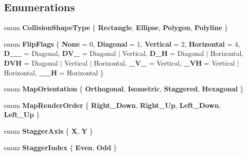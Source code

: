 \subsection*{Enumerations}
\begin{DoxyCompactItemize}
\item 
\mbox{\label{namespace_super_tiled2_unity_a1dc79a7d674bb0cfa8cba3ef988cd9f3}} 
enum {\bfseries Collision\+Shape\+Type} \{ {\bfseries Rectangle}, 
{\bfseries Ellipse}, 
{\bfseries Polygon}, 
{\bfseries Polyline}
 \}
\item 
\mbox{\label{namespace_super_tiled2_unity_a3e1240f05aacb2d37ab178382ef3f92b}} 
enum {\bfseries Flip\+Flags} \{ \newline
{\bfseries None} = 0, 
{\bfseries Diagonal} = 1, 
{\bfseries Vertical} = 2, 
{\bfseries Horizontal} = 4, 
\newline
{\bfseries D\+\_\+\+\_\+} = Diagonal, 
{\bfseries D\+V\+\_\+} = Diagonal $\vert$ Vertical, 
{\bfseries D\+\_\+H} = Diagonal $\vert$ Horizontal, 
{\bfseries D\+VH} = Diagonal $\vert$ Vertical $\vert$ Horizontal, 
\newline
{\bfseries \+\_\+\+V\+\_\+} = Vertical, 
{\bfseries \+\_\+\+VH} = Vertical $\vert$ Horizontal, 
{\bfseries \+\_\+\+\_\+H} = Horizontal
 \}
\item 
\mbox{\label{namespace_super_tiled2_unity_a5f92c37d9d310a28ddc8019606041566}} 
enum {\bfseries Map\+Orientation} \{ {\bfseries Orthogonal}, 
{\bfseries Isometric}, 
{\bfseries Staggered}, 
{\bfseries Hexagonal}
 \}
\item 
\mbox{\label{namespace_super_tiled2_unity_af5f6635752242fe31beeb61f287091a0}} 
enum {\bfseries Map\+Render\+Order} \{ {\bfseries Right\+\_\+\+Down}, 
{\bfseries Right\+\_\+\+Up}, 
{\bfseries Left\+\_\+\+Down}, 
{\bfseries Left\+\_\+\+Up}
 \}
\item 
\mbox{\label{namespace_super_tiled2_unity_ad6fe8d29ad8e1272d778307ee13c6084}} 
enum {\bfseries Stagger\+Axis} \{ {\bfseries X}, 
{\bfseries Y}
 \}
\item 
\mbox{\label{namespace_super_tiled2_unity_af6d80af9a7323aea2f247462c4389f1a}} 
enum {\bfseries Stagger\+Index} \{ {\bfseries Even}, 
{\bfseries Odd}
 \}
\end{DoxyCompactItemize}
